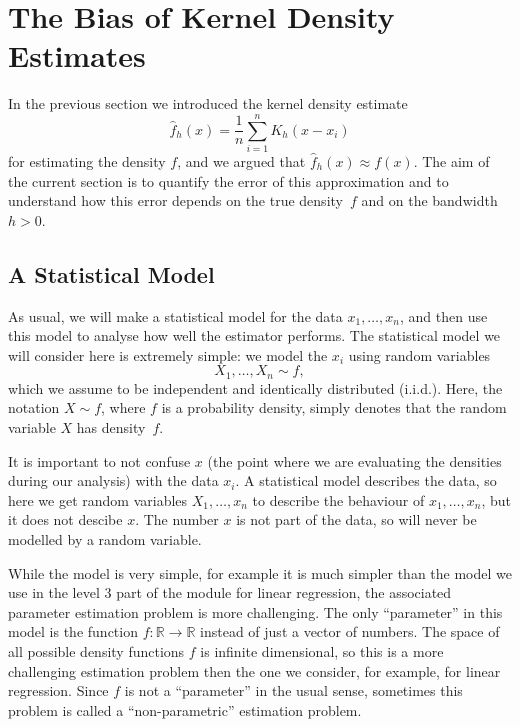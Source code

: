 \documentclass[
  a4paper,
]{article}
\theoremstyle{definition}
\theoremstyle{definition}
\theoremstyle{definition}
\theoremstyle{definition}
\theoremstyle{remark}
\begin{document}
\clearpage

\hypertarget{X02-Bias}{%
\section{The Bias of Kernel Density Estimates}\label{X02-Bias}}

In the previous section we introduced the kernel density estimate
\begin{equation}
  \hat f_h(x)
  = \frac{1}{n} \sum_{i=1}^n K_h(x - x_i)  \label{eq:KDE-est}
\end{equation}
for estimating the density \(f\), and we argued that \(\hat f_h(x) \approx f(x)\).
The aim of the current section is to quantify the error of this approximation
and to understand how this error depends on the true density~\(f\)
and on the bandwidth~\(h > 0\).

\hypertarget{a-statistical-model}{%
\subsection{A Statistical Model}\label{a-statistical-model}}

As usual, we will make a statistical model for the data \(x_1, \ldots, x_n\),
and then use this model to analyse how well the estimator performs.
The statistical model we will consider here is extremely simple: we
model the \(x_i\) using random variables
\begin{equation}
  X_1, \ldots, X_n \sim f,  \label{eq:KDE-model}
\end{equation}
which we assume to be independent and identically distributed (i.i.d.).
Here, the notation \(X \sim f\), where \(f\) is a probability density, simply
denotes that the random variable \(X\) has density~\(f\).

It is important to not confuse \(x\) (the point where we are evaluating
the densities during our analysis) with the data \(x_i\). A statistical
model describes the data, so here we get random variables \(X_1, \ldots, x_n\)
to describe the behaviour of \(x_1, \ldots, x_n\), but it does not descibe \(x\).
The number \(x\) is not part of the data, so will never be modelled by a
random variable.

While the model is very simple, for example it is much simpler than the
model we use in the level 3 part of the module for linear regression,
the associated parameter estimation problem is more challenging.
The only ``parameter'' in this model is the function \(f \colon\mathbb{R}\to \mathbb{R}\)
instead of just a vector of numbers. The space of all possible density
functions \(f\) is infinite dimensional, so this is a more challenging
estimation problem then the one we consider, for example, for linear
regression. Since \(f\) is not a ``parameter'' in the usual sense, sometimes
this problem is called a ``non-parametric'' estimation problem.
\end{document}
